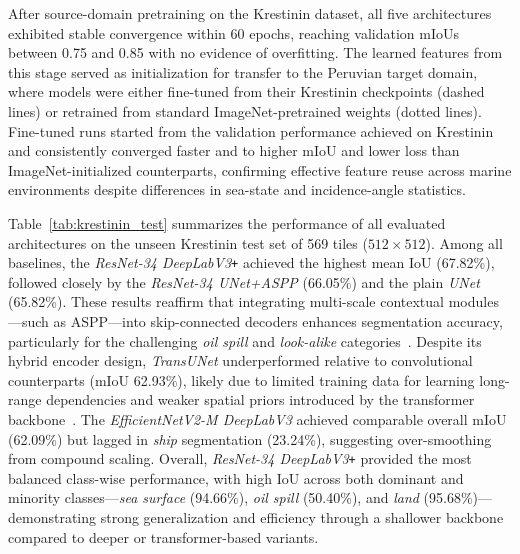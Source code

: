 \documentclass[12pt]{article}
\begin{document}
After source-domain pretraining on the Krestinin dataset, all five architectures exhibited stable convergence within 60 epochs, reaching validation mIoUs between 0.75 and 0.85 with no evidence of overfitting. The learned features from this stage served as initialization for transfer to the Peruvian target domain, where models were either fine-tuned from their Krestinin checkpoints (dashed lines) or retrained from standard ImageNet-pretrained weights (dotted lines). Fine-tuned runs started from the validation performance achieved on Krestinin and consistently converged faster and to higher mIoU and lower loss than ImageNet-initialized counterparts, confirming effective feature reuse across marine environments despite differences in sea-state and incidence-angle statistics. 

Table~\ref{tab:krestinin_test} summarizes the performance of all evaluated architectures on the unseen Krestinin test set of 569 tiles (\(512\times512\)). Among all baselines, the \textit{ResNet-34 DeepLabV3\texttt{+}} achieved the highest mean IoU (67.82\%), followed closely by the \textit{ResNet-34 UNet+ASPP} (66.05\%) and the plain \textit{UNet} (65.82\%). These results reaffirm that integrating multi-scale contextual modules—such as ASPP—into skip-connected decoders enhances segmentation accuracy, particularly for the challenging \textit{oil spill} and \textit{look-alike} categories~\citep{charngDeepLearningSegmentation2020}. Despite its hybrid encoder design, \textit{TransUNet} underperformed relative to convolutional counterparts (mIoU 62.93\%), likely due to limited training data for learning long-range dependencies and weaker spatial priors introduced by the transformer backbone~\citep{dehghani-dehcheshmeh_oil_2023}. The \textit{EfficientNetV2-M DeepLabV3} achieved comparable overall mIoU (62.09\%) but lagged in \textit{ship} segmentation (23.24\%), suggesting over-smoothing from compound scaling. Overall, \textit{ResNet-34 DeepLabV3\texttt{+}} provided the most balanced class-wise performance, with high IoU across both dominant and minority classes—\textit{sea surface} (94.66\%), \textit{oil spill} (50.40\%), and \textit{land} (95.68\%)—demonstrating strong generalization and efficiency through a shallower backbone compared to deeper or transformer-based variants.
\end{document}
